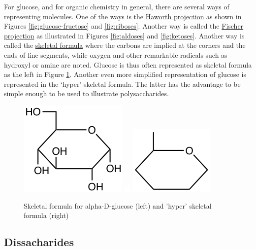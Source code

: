 \documentclass[]{book}
\theoremstyle{definition}
\theoremstyle{definition}
\theoremstyle{definition}
\theoremstyle{remark}
\begin{document}
For glucose, and for organic chemistry in general, there are several
ways of representing molecules. One of the ways is the
\protect\hyperlink{haworth}{Haworth projection} as shown in Figures
\ref{fig:glucose-fructose} and \ref{fig:riboses}. Another way is called
the \protect\hyperlink{Fischer}{Fischer projection} as illustrated in
Figures \ref{fig:aldoses} and \ref{fig:ketoses}. Another way is called
the \protect\hyperlink{skeletal-formula}{skeletal formula} where the
carbons are implied at the corners and the ends of line segments, while
oxygen and other remarkable radicals such as hydroxyl or amine are
noted. Glucose is thus often represented as skeletal formula as the left
in Figure \ref{fig:glucose-skeletal}. Another even more simplified
representation of glucose is represented in the `hyper' skeletal
formula. The latter has the advantage to be simple enough to be used to
illustrate polysaccharides.

\begin{figure}

{\centering \includegraphics[width=0.25\linewidth]{pictures/glucose-skeletal} \includegraphics[width=0.25\linewidth]{pictures/blank} \includegraphics[width=0.25\linewidth]{pictures/glucose-hyperskeletal} 

}

\caption{Skeletal formula for alpha-D-glucose (left) and 'hyper' skeletal formula (right)}\label{fig:glucose-skeletal}
\end{figure}

\subsection{Dissacharides}\label{dissacharides}
\end{document}
